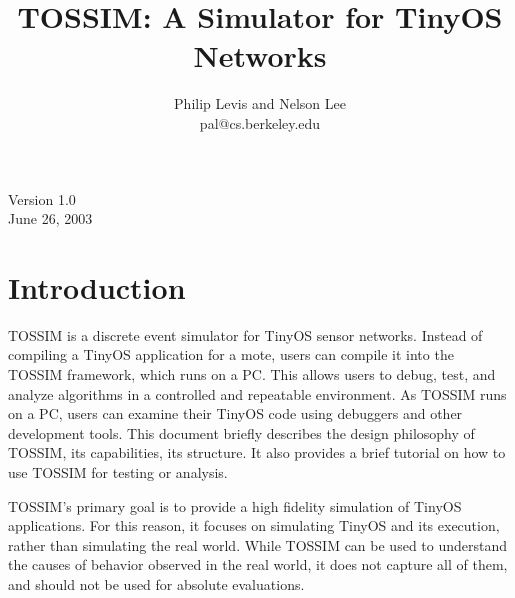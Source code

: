 \documentclass[10pt,fleqn]{article}
\def\sim{TOSSIM\xspace}
\begin{document}
\fontsize{10}{10}                               %

\title{\vspace{2.5in}\sim: A Simulator for TinyOS Networks}
\author{Philip Levis and Nelson Lee\\ pal@cs.berkeley.edu}

\maketitle
\vspace{2in}
\begin{center}
Version 1.0\\
June 26, 2003
\end{center}
\newpage

\fontsize{10}{10}                               %

\tableofcontents

\section{Introduction}

\sim is a discrete event simulator for TinyOS sensor
networks. Instead of compiling a TinyOS application for a mote, users
can compile it into the \sim framework, which runs on a PC. This
allows users to debug, test, and analyze algorithms in a controlled
and repeatable environment. As \sim runs on a PC, users can examine
their TinyOS code using debuggers and other development tools. This
document briefly describes the design philosophy of
\sim, its capabilities, its structure. It also provides a brief
tutorial on how to use \sim for testing or analysis.

\sim's primary goal is to provide a high fidelity simulation of TinyOS
applications. For this reason, it focuses on simulating TinyOS and its
execution, rather than simulating the real world. While \sim can be
used to understand the causes of behavior observed in the real world,
it does not capture all of them, and should not be used for absolute
evaluations.
\end{document}
